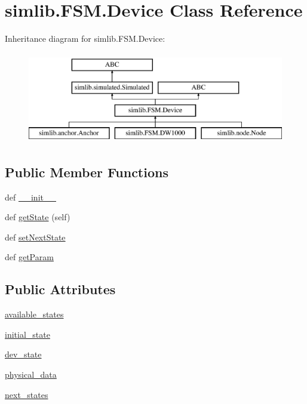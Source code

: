 \hypertarget{classsimlib_1_1_f_s_m_1_1_device}{}\section{simlib.\+F\+S\+M.\+Device Class Reference}
\label{classsimlib_1_1_f_s_m_1_1_device}
Inheritance diagram for simlib.\+F\+S\+M.\+Device\+:\begin{figure}[H]
\begin{center}
\leavevmode
\includegraphics[height=4.000000cm]{classsimlib_1_1_f_s_m_1_1_device}
\end{center}
\end{figure}
\subsection*{Public Member Functions}
\begin{DoxyCompactItemize}
\item 
def \mbox{\hyperlink{classsimlib_1_1_f_s_m_1_1_device_a306e757fa92528b888de0f1b00b0be5c}{\+\_\+\+\_\+init\+\_\+\+\_\+}}
\item 
def \mbox{\hyperlink{classsimlib_1_1_f_s_m_1_1_device_a2f0fc2dd8e6da5688c00ed2004538abb}{get\+State}} (self)
\item 
def \mbox{\hyperlink{classsimlib_1_1_f_s_m_1_1_device_a816c8a7e8c01c9d8e7748f083903466a}{set\+Next\+State}}
\item 
def \mbox{\hyperlink{classsimlib_1_1_f_s_m_1_1_device_a82fec7b5aa14a400069f9170640c8666}{get\+Param}}
\end{DoxyCompactItemize}
\subsection*{Public Attributes}
\begin{DoxyCompactItemize}
\item 
\mbox{\hyperlink{classsimlib_1_1_f_s_m_1_1_device_af6a460115a317bf2705479cc12ebcb81}{available\+\_\+states}}
\item 
\mbox{\hyperlink{classsimlib_1_1_f_s_m_1_1_device_aa931047c9f7d959f59e23e968e70d2c6}{initial\+\_\+state}}
\item 
\mbox{\hyperlink{classsimlib_1_1_f_s_m_1_1_device_ac59c9ebe10d83f78f0840f5e1eb6d351}{dev\+\_\+state}}
\item 
\mbox{\hyperlink{classsimlib_1_1_f_s_m_1_1_device_a3fc1af3d8a1500d7b27e4ad6a80dca59}{physical\+\_\+data}}
\item 
\mbox{\hyperlink{classsimlib_1_1_f_s_m_1_1_device_a90f519879573a37f7200618a70b02218}{next\+\_\+states}}
\end{DoxyCompactItemize}


